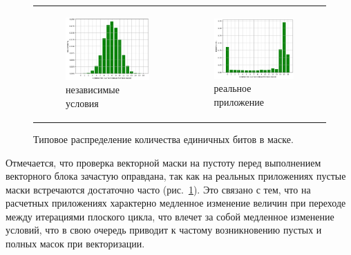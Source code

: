 \documentclass[a4paper,14pt]{extarticle}                     %
\theoremstyle{plain}                                         %
\begin{document}
\begin{figure}[!ht]
\centering
\begin{tabular}{ll}
\begin{subfigure}{0.45\textwidth}\centering\includegraphics[width=0.85\columnwidth]{./fig/vec_mask_distr_independent_p.png}\caption{независимые условия}\end{subfigure} &
\begin{subfigure}{0.45\textwidth}\centering\includegraphics[width=0.85\columnwidth]{./fig/vec_mask_distr_real_p.png}\caption{реальное приложение}\end{subfigure}
\end{tabular}
\singlespacing
\caption{Типовое распределение количества единичных битов в маске.}
\label{fig:vec_masks_density}
\end{figure}

Отмечается, что проверка векторной маски на пустоту перед выполнением векторного блока зачастую оправдана, так как на реальных приложениях пустые маски встречаются достаточно часто (рис.~\ref{fig:vec_masks_density}).
Это связано с тем, что на расчетных приложениях характерно медленное изменение величин при переходе между итерациями плоского цикла, что влечет за собой медленное изменение условий, что в свою очередь приводит к частому возникновению пустых и полных масок при векторизации.
\end{document}
